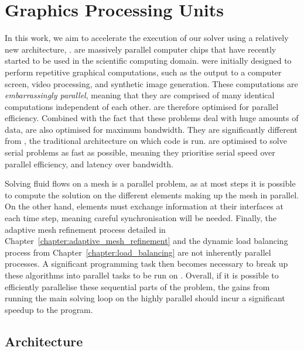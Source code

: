 \chapter{Graphics Processing Units}\label{chapter:graphics_processing_units}

In this work, we aim to accelerate the execution of our solver using a relatively new architecture,
.  are massively parallel computer chips that have recently
started to be used in the scientific computing domain.  were initially designed
to perform repetitive graphical computations, such as the output to a computer screen, video
processing, and synthetic image generation. These computations are \textit{embarrassingly parallel},
meaning that they are comprised of many identical computations independent of each other.
 are therefore optimised for parallel efficiency. Combined with the fact that
these problems deal with huge amounts of data,  are also optimised for maximum
bandwidth. They are significantly different from \textit{}, the traditional
architecture on which code is run.  are optimised to solve serial problems as
fast as possible, meaning they prioritise serial speed over parallel efficiency, and latency over
bandwidth. 

Solving fluid flows on a mesh is a parallel problem, as at most steps it is possible to compute the
solution on the different elements making up the mesh in parallel. On the other hand, elements must
exchange information at their interfaces at each time step, meaning careful synchronisation will be
needed. Finally, the adaptive mesh refinement process detailed in
Chapter~\ref{chapter:adaptive_mesh_refinement} and the dynamic load balancing process from
Chapter~\ref{chapter:load_balancing} are not inherently parallel processes. A significant
programming task then becomes necessary to break up these algorithms into parallel tasks to be run
on . Overall, if it is possible to efficiently parallelise these sequential
parts of the problem, the gains from running the main solving loop on the highly parallel
 should incur a significant speedup to the program.

\section{Architecture}\label{section:graphics_processing_units:architecture}

